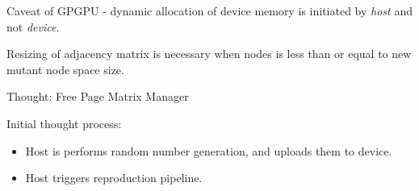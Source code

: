 \documentclass{article}
\begin{document}
Caveat of GPGPU - dynamic allocation of device memory is initiated by \textit{host} and
not \textit{device}.

Resizing of adjacency matrix is necessary when  nodes is less than or equal
to new mutant node space size.

Thought:  Free Page Matrix Manager

Initial thought process:
\begin{itemize}
\item Host is performs random number generation, and uploads them to device.
\item Host triggers reproduction pipeline. 
\end{itemize}
\end{document}
